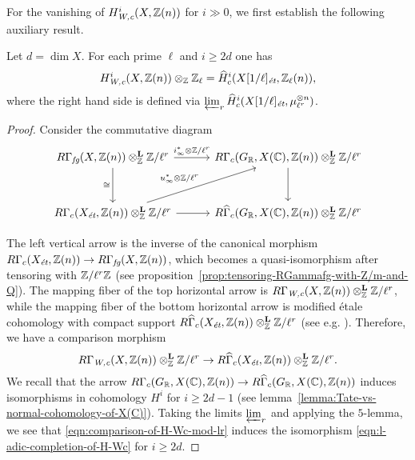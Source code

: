\documentclass{article}
\numberwithin{equation}{section}
\begin{document}
For the vanishing of $H^i_\Wc (X, \ZZ(n))$ for $i \gg 0$, we first establish the
following auxiliary result.

\begin{lemma}
  Let $d = \dim X$. For each prime $\ell$ and $i \ge 2d$ one has
  \begin{equation}
    \label{eqn:l-adic-completion-of-H-Wc}
    H^i_\Wc (X, \ZZ (n)) \otimes_\ZZ \ZZ_\ell =
    \widehat{H}_c^i (X [1/\ell]_\et, \ZZ_\ell (n)),
  \end{equation}
  where the right hand side is defined via
  $\varprojlim_r \widehat{H}_c^i (X [1/\ell]_\et, \mu_{\ell^r}^{\otimes n})$.

  \begin{proof}
    Consider the commutative diagram
    \[ \begin{tikzcd}[row sep=3em, column sep=3em]
        R\Gamma_\fg (X, \ZZ(n)) \otimes_\ZZ^\mathbf{L} \ZZ/\ell^r \ar{r}{i_\infty^* \otimes \ZZ/\ell^r}\ar{d}[swap]{\cong} & R\Gamma_c (G_\RR, X(\CC), \ZZ(n)) \otimes_\ZZ^\mathbf{L} \ZZ/\ell^r\ar{d} \\
        R\Gamma_c (X_\et, \ZZ (n)) \otimes_\ZZ^\mathbf{L} \ZZ/\ell^r \ar{r}\ar{ur}{u_\infty^* \otimes \ZZ/\ell^r} & R\widehat{\Gamma}_c (G_\RR, X(\CC), \ZZ(n)) \otimes_\ZZ^\mathbf{L} \ZZ/\ell^r
      \end{tikzcd} \]

    The left vertical arrow is the inverse of the canonical morphism
    $R\Gamma_c (X_\et, \ZZ(n)) \to R\Gamma_\fg (X, \ZZ(n))$, which becomes a
    quasi-isomorphism after tensoring with $\ZZ/\ell^r\ZZ$
    (see proposition~\ref{prop:tensoring-RGammafg-with-Z/m-and-Q}).
    The mapping fiber of the top horizontal arrow is
    $R\Gamma_\Wc (X, \ZZ (n)) \otimes_\ZZ^\mathbf{L} \ZZ/\ell^r$, while the
    mapping fiber of the bottom horizontal arrow is modified étale cohomology
    with compact support
    $R\widehat{\Gamma}_c (X_\et, \ZZ (n)) \otimes_\ZZ^\mathbf{L} \ZZ/\ell^r$
    (see e.g. \cite[Lemma~6.14]{Flach-Morin-2018}). Therefore, we have a
    comparison morphism
    \begin{equation}
      \label{eqn:comparison-of-H-Wc-mod-lr}
      R\Gamma_\Wc (X, \ZZ (n)) \otimes_\ZZ^\mathbf{L} \ZZ/\ell^r \to
      R\widehat{\Gamma}_c (X_\et, \ZZ (n)) \otimes_\ZZ^\mathbf{L} \ZZ/\ell^r.
    \end{equation}
    We recall that the arrow
    $R\Gamma_c (G_\RR, X(\CC), \ZZ(n)) \to R\widehat{\Gamma}_c (G_\RR, X(\CC), \ZZ(n))$
    induces isomorphisms in cohomology $H^i$ for $i \ge 2d-1$
    (see lemma~\ref{lemma:Tate-vs-normal-cohomology-of-X(C)}).
    Taking the limits $\varprojlim_r$ and applying the $5$-lemma,
    we see that \eqref{eqn:comparison-of-H-Wc-mod-lr} induces the isomorphism
    \eqref{eqn:l-adic-completion-of-H-Wc} for $i \ge 2d$.
  \end{proof}
\end{lemma}
\end{document}
